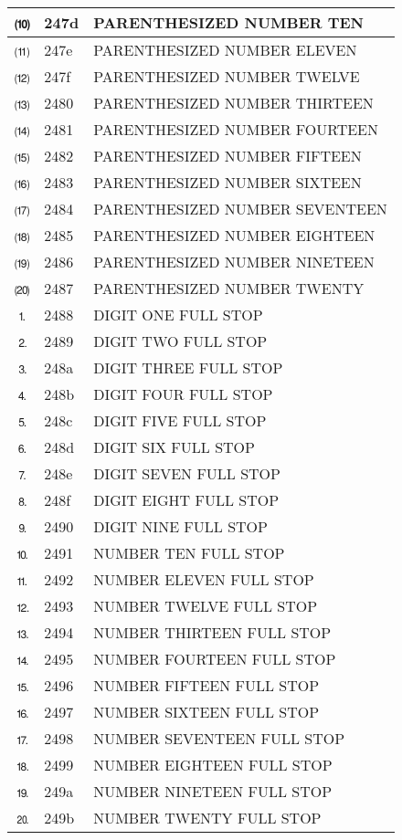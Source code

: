 \documentclass[12pt,letterpaper,openany]{book}
\begin{document}
\begin{center}
\begin{supertabular}{|m{0.25in}|m{0.5in}|m{4in}|}
⑽ & 247d & PARENTHESIZED NUMBER TEN\\\hline
⑾ & 247e & PARENTHESIZED NUMBER ELEVEN\\\hline
⑿ & 247f & PARENTHESIZED NUMBER TWELVE\\\hline
⒀ & 2480 & PARENTHESIZED NUMBER THIRTEEN\\\hline
⒁ & 2481 & PARENTHESIZED NUMBER FOURTEEN\\\hline
⒂ & 2482 & PARENTHESIZED NUMBER FIFTEEN\\\hline
⒃ & 2483 & PARENTHESIZED NUMBER SIXTEEN\\\hline
⒄ & 2484 & PARENTHESIZED NUMBER SEVENTEEN\\\hline
⒅ & 2485 & PARENTHESIZED NUMBER EIGHTEEN\\\hline
⒆ & 2486 & PARENTHESIZED NUMBER NINETEEN\\\hline
⒇ & 2487 & PARENTHESIZED NUMBER TWENTY\\\hline
⒈ & 2488 & DIGIT ONE FULL STOP\\\hline
⒉ & 2489 & DIGIT TWO FULL STOP\\\hline
⒊ & 248a & DIGIT THREE FULL STOP\\\hline
⒋ & 248b & DIGIT FOUR FULL STOP\\\hline
⒌ & 248c & DIGIT FIVE FULL STOP\\\hline
⒍ & 248d & DIGIT SIX FULL STOP\\\hline
⒎ & 248e & DIGIT SEVEN FULL STOP\\\hline
⒏ & 248f & DIGIT EIGHT FULL STOP\\\hline
⒐ & 2490 & DIGIT NINE FULL STOP\\\hline
⒑ & 2491 & NUMBER TEN FULL STOP\\\hline
⒒ & 2492 & NUMBER ELEVEN FULL STOP\\\hline
⒓ & 2493 & NUMBER TWELVE FULL STOP\\\hline
⒔ & 2494 & NUMBER THIRTEEN FULL STOP\\\hline
⒕ & 2495 & NUMBER FOURTEEN FULL STOP\\\hline
⒖ & 2496 & NUMBER FIFTEEN FULL STOP\\\hline
⒗ & 2497 & NUMBER SIXTEEN FULL STOP\\\hline
⒘ & 2498 & NUMBER SEVENTEEN FULL STOP\\\hline
⒙ & 2499 & NUMBER EIGHTEEN FULL STOP\\\hline
⒚ & 249a & NUMBER NINETEEN FULL STOP\\\hline
⒛ & 249b & NUMBER TWENTY FULL STOP\\\hline

\end{supertabular}
\end{center}
\end{document}
